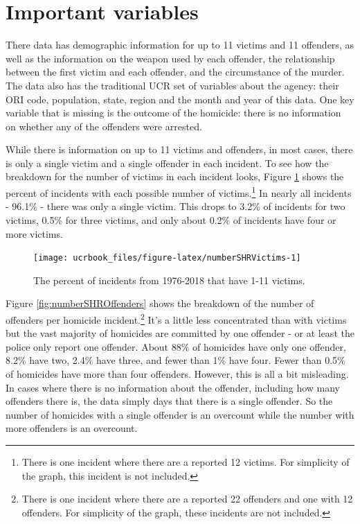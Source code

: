 \documentclass[
  12pt,
  openany]{book}
\begin{document}
\hypertarget{important-variables-2}{%
\section{Important variables}\label{important-variables-2}}

There data has demographic information for up to 11 victims and 11 offenders, as well as the information on the weapon used by each offender, the relationship between the first victim and each offender, and the circumstance of the murder. The data also has the traditional UCR set of variables about the agency: their ORI code, population, state, region and the month and year of this data. One key variable that is missing is the outcome of the homicide: there is no information on whether any of the offenders were arrested.

While there is information on up to 11 victims and offenders, in most cases, there is only a single victim and a single offender in each incident. To see how the breakdown for the number of victims in each incident looks, Figure \ref{fig:numberSHRVictims} shows the percent of incidents with each possible number of victims.\footnote{There is one incident where there are a reported 12 victims. For simplicity of the graph, this incident is not included.} In nearly all incidents - 96.1\% - there was only a single victim. This drops to 3.2\% of incidents for two victims, 0.5\% for three victims, and only about 0.2\% of incidents have four or more victims.

\begin{figure}

{\centering \texttt{[image: ucrbook\_files/figure-latex/numberSHRVictims-1]} 

}

\caption{The percent of incidents from 1976-2018 that have 1-11 victims.}\label{fig:numberSHRVictims}
\end{figure}

Figure \ref{fig:numberSHROffenders} shows the breakdown of the number of offenders per homicide incident.\footnote{There is one incident where there are a reported 22 offenders and one with 12 offenders. For simplicity of the graph, these incidents are not included.} It's a little less concentrated than with victims but the vast majority of homicides are committed by one offender - or at least the police only report one offender. About 88\% of homicides have only one offender, 8.2\% have two, 2.4\% have three, and fewer than 1\% have four. Fewer than 0.5\% of homicides have more than four offenders. However, this is all a bit misleading. In cases where there is no information about the offender, including how many offenders there is, the data simply days that there is a single offender. So the number of homicides with a single offender is an overcount while the number with more offenders is an overcount.
\end{document}

